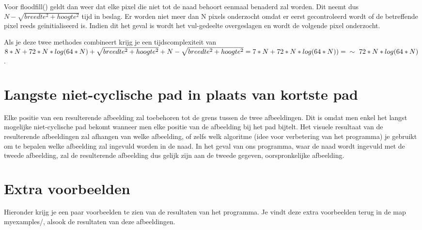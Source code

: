 \documentclass{article}
\begin{document}
Voor floodfill() geldt dan weer dat elke pixel die niet tot de naad behoort eenmaal benaderd zal worden. Dit neemt dus $ N - \sqrt{breedte^2 + hoogte^2} $ tijd in beslag. Er worden niet meer dan N pixels onderzocht omdat er eerst gecontroleerd wordt of de betreffende pixel reeds geïnitialiseerd is. Indien dit het geval is wordt het vul-gedeelte overgeslagen en wordt de volgende pixel onderzocht.

Als je deze twee methodes combineert krijg je een tijdscomplexiteit van $ 8 * N + 72 * N * log (64 * N) + \sqrt{breedte^2 + hoogte^2}  +  N - \sqrt{breedte^2 + hoogte^2} = 7 * N + 72 * N * log (64 * N)) = \newline  \sim\ 72 * N * log (64 * N) $.

\newpage
\section{Langste niet-cyclische pad in plaats van kortste pad}

Elke positie van een resulterende afbeelding zal toebehoren tot de grens tussen de twee afbeeldingen. Dit is omdat men enkel het langst mogelijke niet-cyclische pad bekomt wanneer men elke positie van de afbeelding bij het pad bijtelt. 
Het visuele resultaat van de resulterende afbeeldingen zal afhangen van welke afbeelding, of zelfs welk algoritme (idee voor verbetering van het programma) je gebruikt om te bepalen welke afbeelding zal ingevuld worden in de naad. In het geval van ons programma, waar de naad wordt ingevuld met de tweede afbeelding, zal de resulterende afbeelding dus gelijk zijn aan de tweede gegeven, oorspronkelijke afbeelding.

\section{Extra voorbeelden}
Hieronder krijg je een paar voorbeelden te zien van de resultaten van het programma.
Je vindt deze extra voorbeelden terug in de map myexamples/, alsook de resultaten van deze afbeeldingen.
\end{document}
